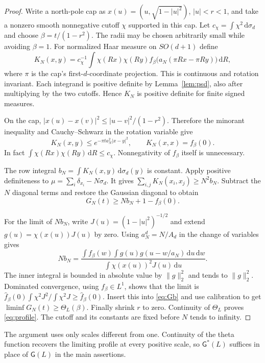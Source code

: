 \documentclass[11pt,a4paper]{article}
\theoremstyle{definition}
\newcommand{\dd}{\,\mathrm d}
\newcommand{\norm}[1]{\lVert#1\rVert}
\newcommand{\abs}[1]{\lvert#1\rvert}
\newcommand{\G}{\mathsf G}
\numberwithin{equation}{section}
\begin{document}
\begin{proof}
Write a north-pole cap as $x(u)=(u,\sqrt{1-\abs u^2})$, $\abs u<r<1$, and take a nonzero smooth nonnegative cutoff $\chi$ supported in this cap. Let $c_\chi=\int\chi^2\dd\sigma_d$ and choose $\beta=t/(1-r^2)$. The radii may be chosen arbitrarily small while avoiding $\beta=1$. For normalized Haar measure on $SO(d+1)$ define
\begin{equation}\label{eq:localized}
 K_N(x,y)=c_\chi^{-1}\int\chi(Rx)\chi(Ry)
 f_\beta\bigl(a_N(\pi Rx-\pi Ry)\bigr)\dd R,
\end{equation}
where $\pi$ is the cap's first-$d$-coordinate projection. This is continuous and rotation invariant. Each integrand is positive definite by Lemma~\ref{lem:psd}, also after multiplying by the two cutoffs. Hence $K_N$ is positive definite for finite signed measures.

On the cap, $\abs{x(u)-x(v)}^2\le\abs{u-v}^2/(1-r^2)$. Therefore the minorant inequality and Cauchy--Schwarz in the rotation variable give
\begin{equation}\label{eq:Kbound}
 K_N(x,y)\le e^{-\pi t a_N^2\abs{x-y}^2},\qquad K_N(x,x)=f_\beta(0).
\end{equation}
In fact $\int\chi(Rx)\chi(Ry)\dd R\le c_\chi$. Nonnegativity of $f_\beta$ itself is unnecessary.

The row integral $b_N=\int K_N(x,y)\dd\sigma_d(y)$ is constant. Apply positive definiteness to $\mu=\sum_i\delta_{x_i}-N\sigma_d$. It gives $\sum_{i,j}K_N(x_i,x_j)\ge N^2b_N$. Subtract the $N$ diagonal terms and restore the Gaussian diagonal to obtain
\begin{equation}\label{eq:Gb}
 G_N(t)\ge Nb_N+1-f_\beta(0).
\end{equation}

For the limit of $Nb_N$, write $J(u)=(1-\abs u^2)^{-1/2}$ and extend $g(u)=\chi(x(u))J(u)$ by zero. Using $a_N^d=N/A_d$ in the change of variables gives
\begin{equation}\label{eq:rowlimit}
 Nb_N=\frac{\displaystyle\int f_\beta(w)\int g(u)g(u-w/a_N)\dd u\dd w}
                  {\displaystyle\int\chi(x(u))^2J(u)\dd u}.
\end{equation}
The inner integral is bounded in absolute value by $\norm g_2^2$ and tends to $\norm g_2^2$. Dominated convergence, using $f_\beta\in L^1$, shows that the limit is
$\widehat f_\beta(0)\int\chi^2J^2/\int\chi^2J\ge\widehat f_\beta(0)$.
Insert this into \eqref{eq:Gb} and use calibration to get $\liminf G_N(t)\ge\Theta_L(\beta)$. Finally shrink $r$ to zero. Continuity of $\Theta_L$ proves \eqref{eq:profile}. The cutoff and its constants are fixed before $N$ tends to infinity.
\end{proof}
The argument uses only scales different from one. Continuity of the theta function recovers the limiting profile at every positive scale, so $\G^*(L)$ suffices in place of $\G(L)$ in the main assertions.
\end{document}
